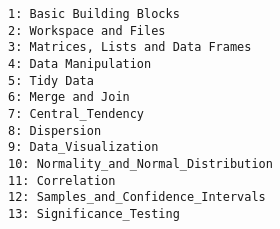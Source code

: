 \documentclass[12pt,article]{article}
\begin{document}
\large
\begin{verbatim}
1: Basic Building Blocks
2: Workspace and Files
3: Matrices, Lists and Data Frames
4: Data Manipulation
5: Tidy Data
6: Merge and Join
7: Central_Tendency
8: Dispersion
9: Data_Visualization
10: Normality_and_Normal_Distribution
11: Correlation
12: Samples_and_Confidence_Intervals
13: Significance_Testing
\end{verbatim}
\end{document}
